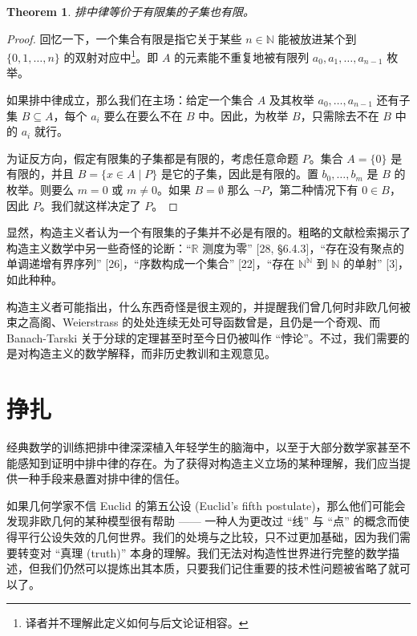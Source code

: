 \documentclass{ctexart}
\newtheorem{theorem}{Theorem}
\begin{document}
    \begin{theorem}
        排中律等价于有限集的子集也有限。
    \end{theorem}

    \begin{proof}
        回忆一下，一个集合有限是指它关于某些 \(n\in \mathbb{N}\) 能被放进某个到 \( \{0, 1, \dots, n\} \) 的双射对应中\footnote{译者并不理解此定义如何与后文论证相容。}。即 \(A\) 的元素能不重复地被有限列 \(a_0, a_1, \dots, a_{n-1}\) 枚举。

        如果排中律成立，那么我们在主场：给定一个集合 \(A\) 及其枚举 \(a_0, \dots, a_{n-1}\) 还有子集 \(B \subseteq A\)，每个 \(a_i\) 要么在要么不在 \(B\) 中。因此，为枚举 \(B\)，只需除去不在 \(B\) 中的 \(a_i\) 就行。

        为证反方向，假定有限集的子集都是有限的，考虑任意命题 \(P\)。集合 \(A = \{0\}\) 是有限的，并且 \(B = \{x\in A \mid P\}\) 是它的子集，因此是有限的。置 \(b_0, \dots, b_m\) 是 \(B\) 的枚举。则要么 \(m = 0 \) 或 \(m \neq 0\)。如果 \(B = \emptyset\) 那么 \(\neg P\)，第二种情况下有 \(0\in B\)，因此 \(P\)。我们就这样决定了 \(P\)。
    \end{proof}

    显然，构造主义者认为一个有限集的子集并不必是有限的。粗略的文献检索揭示了构造主义数学中另一些奇怪的论断：“\(\mathbb R\) 测度为零” [28, §6.4.3]，“存在没有聚点的单调递增有界序列” [26]，“序数构成一个集合” [22]，“存在 \(\mathbb{N} ^ \mathbb{N}\) 到 \(\mathbb N\) 的单射” [3]，如此种种。

    构造主义者可能指出，什么东西奇怪是很主观的，并提醒我们曾几何时非欧几何被束之高阁、Weierstrass 的处处连续无处可导函数曾是，且仍是一个奇观、而 Banach-Tarski 关于分球的定理甚至时至今日仍被叫作 “悖论”。不过，我们需要的是对构造主义的数学解释，而非历史教训和主观意见。

  \section{挣扎}
    经典数学的训练把排中律深深植入年轻学生的脑海中，以至于大部分数学家甚至不能感知到证明中排中律的存在。为了获得对构造主义立场的某种理解，我们应当提供一种手段来悬置对排中律的信任。

    如果几何学家不信 Euclid 的第五公设 (Euclid’s ﬁfth postulate)，那么他们可能会发现非欧几何的某种模型很有帮助 —— 一种人为更改过 “线” 与 “点” 的概念而使得平行公设失效的几何世界。我们的处境与之比较，只不过更加基础，因为我们需要转变对 “真理 (truth)” 本身的理解。我们无法对构造性世界进行完整的数学描述，但我们仍然可以提炼出其本质，只要我们记住重要的技术性问题被省略了就可以了。
\end{document}
